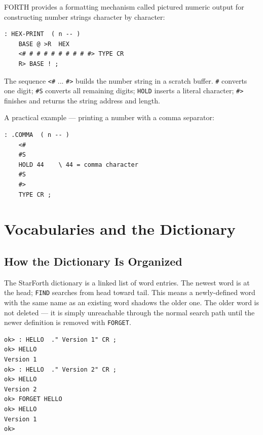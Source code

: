 FORTH provides a formatting mechanism called pictured numeric output for
constructing number strings character by character:

\begin{lstlisting}[language=Forth]
: HEX-PRINT  ( n -- )
    BASE @ >R  HEX
    <# # # # # # # # # #> TYPE CR
    R> BASE ! ;
\end{lstlisting}

The sequence \texttt{<\#} ... \texttt{\#>} builds the number string in a
scratch buffer. \texttt{\#} converts one digit; \texttt{\#S} converts all
remaining digits; \texttt{HOLD} inserts a literal character; \texttt{\#>}
finishes and returns the string address and length.

A practical example --- printing a number with a comma separator:

\begin{lstlisting}[language=Forth]
: .COMMA  ( n -- )
    <#
    #S
    HOLD 44    \ 44 = comma character
    #S
    #>
    TYPE CR ;
\end{lstlisting}

\chapter{Vocabularies and the Dictionary}
\label{chap:vocabularies}

\section{How the Dictionary Is Organized}
\label{sec:dict-structure}

The StarForth dictionary is a linked list of word entries. The newest word is
at the head; \texttt{FIND} searches from head toward tail. This means a
newly-defined word with the same name as an existing word shadows the older
one. The older word is not deleted --- it is simply unreachable through the
normal search path until the newer definition is removed with \texttt{FORGET}.

\begin{lstlisting}[language=Forth]
ok> : HELLO  ." Version 1" CR ;
ok> HELLO
Version 1
ok> : HELLO  ." Version 2" CR ;
ok> HELLO
Version 2
ok> FORGET HELLO
ok> HELLO
Version 1
ok>
\end{lstlisting}

